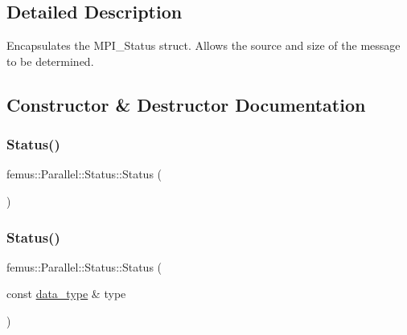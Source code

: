 \subsection{Detailed Description}
Encapsulates the M\+P\+I\+\_\+\+Status struct. Allows the source and size of the message to be determined. 

\subsection{Constructor \& Destructor Documentation}
\mbox{\label{classfemus_1_1_parallel_1_1_status_a22333a3cb6ad0ff5f8e0a157e884ad15}} 
\subsubsection{\texorpdfstring{Status()}{Status()}\hspace{0.1cm}{\footnotesize\ttfamily [1/6]}}
{\footnotesize\ttfamily femus\+::\+Parallel\+::\+Status\+::\+Status (\begin{DoxyParamCaption}{ }\end{DoxyParamCaption})\hspace{0.3cm}{\ttfamily [inline]}}

\mbox{\label{classfemus_1_1_parallel_1_1_status_a6ab85fbd1839c12c36fceeefd6bbb78c}} 
\subsubsection{\texorpdfstring{Status()}{Status()}\hspace{0.1cm}{\footnotesize\ttfamily [2/6]}}
{\footnotesize\ttfamily femus\+::\+Parallel\+::\+Status\+::\+Status (\begin{DoxyParamCaption}\item[{const \mbox{\hyperlink{structfemus_1_1_parallel_1_1data__type}{data\+\_\+type}} \&}]{type }\end{DoxyParamCaption})\hspace{0.3cm}{\ttfamily [inline]}}

